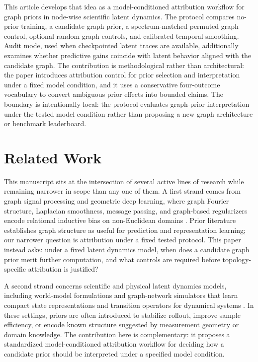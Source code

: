 \documentclass[preprint,12pt]{elsarticle}
\begin{document}
This article develops that idea as a model-conditioned attribution workflow for graph priors in node-wise scientific latent dynamics. The protocol compares no-prior training, a candidate graph prior, a spectrum-matched permuted graph control, optional random-graph controls, and calibrated temporal smoothing. Audit mode, used when checkpointed latent traces are available, additionally examines whether predictive gains coincide with latent behavior aligned with the candidate graph. The contribution is methodological rather than architectural: the paper introduces attribution control for prior selection and interpretation under a fixed model condition, and it uses a conservative four-outcome vocabulary to convert ambiguous prior effects into bounded claims. The boundary is intentionally local: the protocol evaluates graph-prior interpretation under the tested model condition rather than proposing a new graph architecture or benchmark leaderboard.

\section{Related Work}

This manuscript sits at the intersection of several active lines of research while remaining narrower in scope than any one of them. A first strand comes from graph signal processing and geometric deep learning, where graph Fourier structure, Laplacian smoothness, message passing, and graph-based regularizers encode relational inductive bias on non-Euclidean domains \citep{chung1997spectral,shuman2013emerging,ortega2018graph,bronstein2021geometric,kipf2017semi,gilmer2017neural,battaglia2018relational}. Prior literature establishes graph structure as useful for prediction and representation learning; our narrower question is attribution under a fixed tested protocol. This paper instead asks: under a fixed latent dynamics model, when does a candidate graph prior merit further computation, and what controls are required before topology-specific attribution is justified?

A second strand concerns scientific and physical latent dynamics models, including world-model formulations and graph-network simulators that learn compact state representations and transition operators for dynamical systems \citep{hansen2024tdmpc2,hafner2023dreamerv3,hansen2024puppeteer,sanchez2020learning}. In these settings, priors are often introduced to stabilize rollout, improve sample efficiency, or encode known structure suggested by measurement geometry or domain knowledge. The contribution here is complementary: it proposes a standardized model-conditioned attribution workflow for deciding how a candidate prior should be interpreted under a specified model condition.
\end{document}
